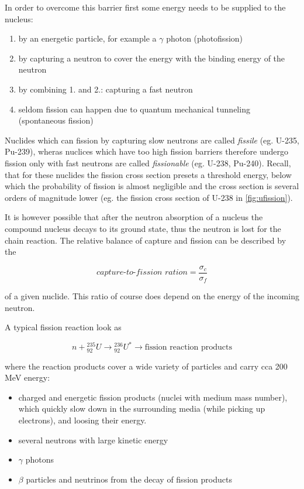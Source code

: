 In order to overcome this barrier first some energy needs to be supplied to the nucleus:

\begin{enumerate}
\item by an energetic particle, for example a $\gamma$ photon (photofission)
\item by capturing a neutron to cover the energy with the binding energy of the neutron
\item by combining 1. and 2.: capturing a fast neutron
\item seldom fission can happen due to quantum mechanical tunneling (spontaneous fission)
\end{enumerate}

Nuclides which can fission by capturing slow neutrons are called \textit{fissile} (eg. U-235, Pu-239), wheras nuclices which have too high fission barriers therefore undergo fission only with fast neutrons are called \textit{fissionable} (eg. U-238, Pu-240). Recall, that for these nuclides the fission cross section presets a threshold energy, below which the probability of fission is almost negligible and the cross section is several orders of magnitude lower (eg. the fission cross section of U-238 in \autoref{fig:ufission}).

It is however possible that after the neutron absorption of a nucleus the compound nucleus decays to its ground state, thus the neutron is lost for the chain reaction. The relative balance of capture and fission can be described by the 

\begin{equation}
\textit{capture-to-fission ration}=\frac{\sigma_c}{\sigma_f}
\end{equation}

of a given nuclide. This ratio of course does depend on the energy of the incoming neutron.

A typical fission reaction look as 

\[
n+{}_{92}^{235}U\rightarrow {}_{92}^{236}U^* \rightarrow \text{fission reaction products}
\]

where the reaction products cover a wide variety of particles and carry cca 200 MeV energy:

\begin{itemize}
\item charged and energetic fission products (nuclei with medium mass number), which quickly slow down in the surrounding media (while picking up electrons), and loosing their energy.
\item several neutrons with large kinetic energy
\item $\gamma$ photons
\item $\beta$ particles and neutrinos from the decay of fission products
\end{itemize}

